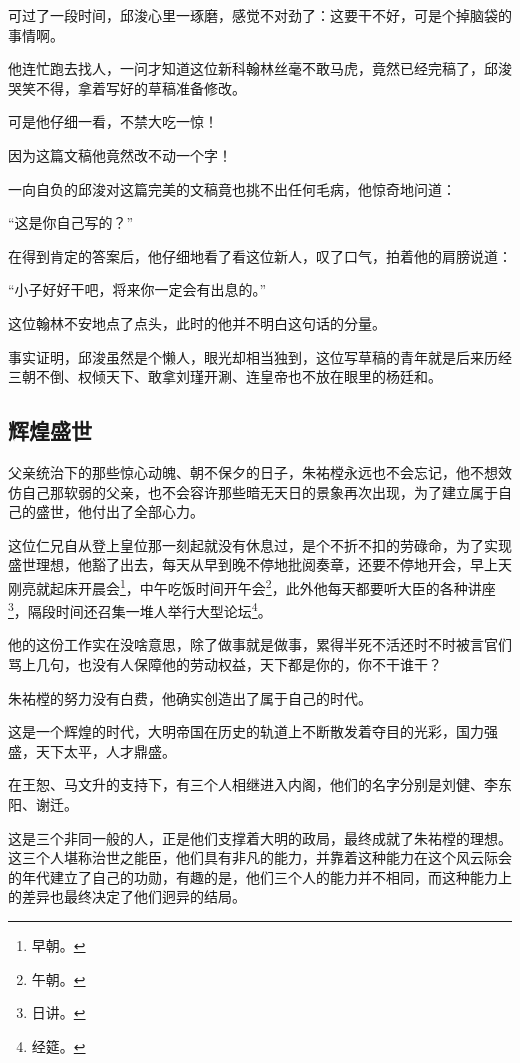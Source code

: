 \begin{multicols}{\theparacolNo}
可过了一段时间，邱浚心里一琢磨，感觉不对劲了：这要干不好，可是个掉脑袋的事情啊。

他连忙跑去找人，一问才知道这位新科翰林丝毫不敢马虎，竟然已经完稿了，邱浚哭笑不得，拿着写好的草稿准备修改。

可是他仔细一看，不禁大吃一惊！

因为这篇文稿他竟然改不动一个字！

一向自负的邱浚对这篇完美的文稿竟也挑不出任何毛病，他惊奇地问道：

“这是你自己写的？”

在得到肯定的答案后，他仔细地看了看这位新人，叹了口气，拍着他的肩膀说道：

“小子好好干吧，将来你一定会有出息的。”

这位翰林不安地点了点头，此时的他并不明白这句话的分量。

事实证明，邱浚虽然是个懒人，眼光却相当独到，这位写草稿的青年就是后来历经三朝不倒、权倾天下、敢拿刘瑾开涮、连皇帝也不放在眼里的杨廷和。

\subsection{辉煌盛世}
父亲统治下的那些惊心动魄、朝不保夕的日子，朱祐樘永远也不会忘记，他不想效仿自己那软弱的父亲，也不会容许那些暗无天日的景象再次出现，为了建立属于自己的盛世，他付出了全部心力。

这位仁兄自从登上皇位那一刻起就没有休息过，是个不折不扣的劳碌命，为了实现盛世理想，他豁了出去，每天从早到晚不停地批阅奏章，还要不停地开会，早上天刚亮就起床开晨会\footnote{早朝。}，中午吃饭时间开午会\footnote{午朝。}，此外他每天都要听大臣的各种讲座\footnote{日讲。}，隔段时间还召集一堆人举行大型论坛\footnote{经筵。}。

他的这份工作实在没啥意思，除了做事就是做事，累得半死不活还时不时被言官们骂上几句，也没有人保障他的劳动权益，天下都是你的，你不干谁干？

朱祐樘的努力没有白费，他确实创造出了属于自己的时代。

这是一个辉煌的时代，大明帝国在历史的轨道上不断散发着夺目的光彩，国力强盛，天下太平，人才鼎盛。

在王恕、马文升的支持下，有三个人相继进入内阁，他们的名字分别是刘健、李东阳、谢迁。

这是三个非同一般的人，正是他们支撑着大明的政局，最终成就了朱祐樘的理想。这三个人堪称治世之能臣，他们具有非凡的能力，并靠着这种能力在这个风云际会的年代建立了自己的功勋，有趣的是，他们三个人的能力并不相同，而这种能力上的差异也最终决定了他们迥异的结局。


\end{multicols}
